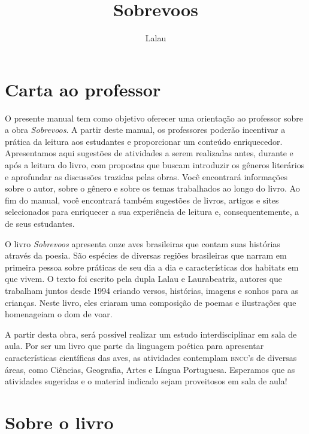\documentclass[11pt]{extarticle}
\newcommand{\AutorLivro}{Lalau}
\newcommand{\TituloLivro}{Sobrevoos}
\newcommand{\colaborador}{Ana Lancman}
\begin{document}
\title{\TituloLivro}
\author{\AutorLivro}
\def\authornotes{\colaborador}

\date{}
\maketitle


\tableofcontents

\section{Carta ao professor}

O presente manual tem como objetivo oferecer uma orientação ao professor sobre a obra \textit{Sobrevoos}. A partir deste manual, os professores poderão incentivar a prática da leitura aos estudantes e proporcionar um conteúdo enriquecedor. Apresentamos aqui sugestões de atividades a serem realizadas antes, durante e após a leitura do livro, com propostas que buscam introduzir os gêneros literários e aprofundar as discussões trazidas pelas obras. Você encontrará informações sobre o autor, sobre o gênero e sobre os temas trabalhados ao longo do livro. Ao fim do manual, você encontrará também sugestões de livros, artigos e sites selecionados para enriquecer a sua experiência de leitura e, consequentemente, a de seus estudantes.

O livro \textit{Sobrevoos} apresenta onze aves brasileiras que contam suas histórias através da poesia. São espécies de diversas regiões brasileiras que narram em primeira pessoa sobre práticas de seu dia a dia e características dos habitats em que vivem. O texto foi escrito pela dupla Lalau e Laurabeatriz, autores que trabalham juntos desde 1994 criando versos, histórias, imagens
e sonhos para as crianças. Neste livro, eles criaram uma composição de poemas e ilustrações que homenageiam o dom de voar. 

A partir desta obra, será possível realizar um estudo interdisciplinar em sala de aula. Por ser um livro que parte da linguagem poética para apresentar características científicas das aves, as atividades contemplam \textsc{bncc}'s de diversas áreas, como Ciências, Geografia, Artes e Língua Portuguesa. Esperamos que as atividades sugeridas e o material indicado sejam proveitosos em sala de aula! 

\section{Sobre o livro}
\end{document}

